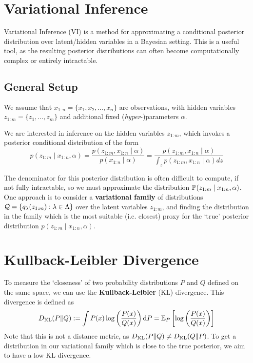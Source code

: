 \documentclass[11pt]{article}
\numberwithin{figure}{section}
\numberwithin{equation}{section}
\begin{document}
\section{Variational Inference}

Variational Inference (VI) is a method for approximating a conditional posterior distribution over latent/hidden variables in a Bayesian setting. This is a useful tool, as the resulting posterior distributions can often become computationally complex or entirely intractable. 

\subsection{General Setup}
We assume that ${x}_{1:n} = \{x_{1}, x_{2}, \dots, x_{n}\}$ are observations, with hidden variables ${z}_{1:m} = \{z_1, \dots, z_m\}$ and additional fixed (\textit{hyper}-)parameters $\alpha$. 

We are interested in inference on the hidden variables ${z}_{1:m}$, which invokes a posterior conditional distribution of the form 
\begin{equation}
    p(z_{1:m} \mid x_{1:n}, \alpha) = \frac{p(z_{1:m}, x_{1:n} \mid \alpha)}{p(x_{1:n} \mid \alpha)} = \frac{p(z_{1:m}, x_{1:n} \mid \alpha)}{\int_{z}p(z_{1:m}, x_{1:n} \mid \alpha)dz}
\end{equation}

The denominator for this posterior distribution is often difficult to compute, if not fully intractable, so we must approximate the distribution $\prob{z_{1:m}\mid x_{1:n}, \alpha}$. One approach is to consider a \textbf{variational family} of distributions $\calQ = \{q_{\lambda}(z_{1:m}): \lambda \in \Lambda\}$ over the latent variables $z_{1:m}$, and finding the distribution in the family which is the most suitable (i.e. closest) proxy for the `true' posterior distribution $p(z_{1:m} \mid x_{1:n}, \alpha)$.

\section{Kullback-Leibler Divergence}
To measure the `closeness' of two probability distributions $P$ and $Q$ defined on the same space, we can use the \textbf{Kullback-Leibler} (KL) divergence. This divergence is defined as 
\begin{equation}
    \KLdiv{P}{Q} := \int P(x)\log\left(\frac{P(x)}{Q(x)}\right)\textrm{d}P = \expec[P]{\log\left(\frac{P(x)}{Q(x)}\right)}
\end{equation}
Note that this is not a distance metric, as $\KLdiv{P}{Q} \ne \KLdiv{Q}{P}$. To get a distribution in our variational family which is close to the true posterior, we aim to have a low KL divergence.
\end{document}
